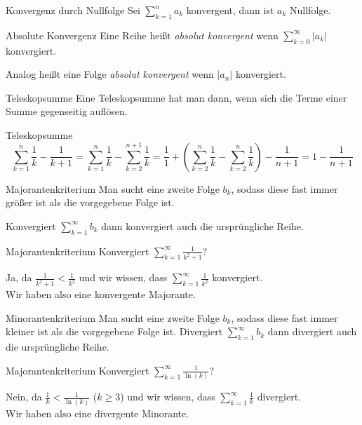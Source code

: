 \documentclass[german]{../spicker}
\begin{document}
\begin{bonus}{Konvergenz durch Nullfolge}
    Sei $\sum^n_{k=1}a_k$ konvergent, dann ist $a_k$ Nullfolge.
\end{bonus}

\begin{defi}{Absolute Konvergenz}
    Eine Reihe heißt \emph{absolut konvergent} wenn $\sum_{k=0}^{\infty} |a_k|$ konvergiert.

    Analog heißt eine Folge \emph{absolut konvergent} wenn $|a_n|$ konvergiert.
\end{defi}

\begin{algo}{Teleskopsumme}
    Eine Teleskopsumme hat man dann, wenn sich die Terme einer Summe gegenseitig auflösen.
\end{algo}

\begin{example}{Teleskopsumme}
    \[
        \sum_{k=1}^n \frac{1}{k} - \frac{1}{k+1} = \sum_{k=1}^n \frac{1}{k} - \sum_{k=2}^{n+1} \frac{1}{k} = \frac{1}{1} +\left( \sum_{k=2}^n \frac{1}{k} - \sum_{k=2}^n \frac{1}{k} \right) - \frac{1}{n+1} = 1-\frac{1}{n+1}
    \]
\end{example}

\begin{algo}{Majorantenkriterium}
    Man sucht eine zweite Folge $b_k$, sodass diese fast immer größer ist als die vorgegebene Folge ist.

    Konvergiert $\sum_{k=1}^{\infty} b_k$ dann konvergiert auch die ursprüngliche Reihe.
\end{algo}

\begin{example}{Majorantenkriterium}
    Konvergiert $\sum_{k=1}^{\infty} \frac{1}{k^2+1}$?

    Ja, da $\frac{1}{k^2+1} < \frac{1}{k^2}$ und wir wissen, dass $\sum_{k=1}^{\infty} \frac{1}{k^2}$ konvergiert.\\
    Wir haben also eine konvergente Majorante.
\end{example}

\begin{algo}{Minorantenkriterium}
    Man sucht eine zweite Folge $b_k$, sodass diese fast immer kleiner ist als die vorgegebene Folge ist.
    Divergiert $\sum_{k=1}^{\infty} b_k$ dann divergiert auch die ursprüngliche Reihe.
\end{algo}

\begin{example}{Majorantenkriterium}
    Konvergiert $\sum_{k=1}^{\infty} \frac{1}{\ln(k)}$?

    Nein, da $\frac{1}{k} < \frac{1}{\ln(k)}$ ($k\geq3$) und wir wissen, dass $\sum_{k=1}^{\infty} \frac{1}{k}$ divergiert.\\
    Wir haben also eine divergente Minorante.
\end{example}
\end{document}
